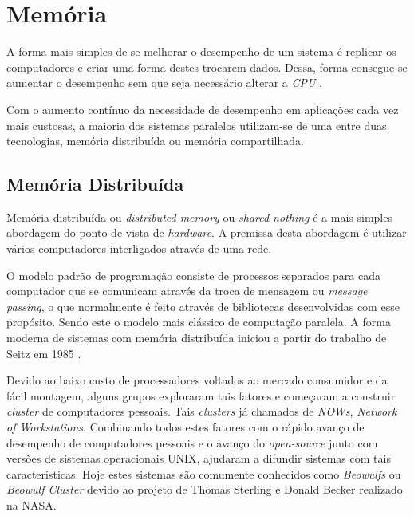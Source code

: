 \section{Memória}

A forma mais simples de se melhorar o desempenho de um sistema é
replicar os computadores e criar uma forma destes trocarem dados.
Dessa, forma consegue-se aumentar o desempenho sem que seja necessário alterar a
\textit{CPU} \cite[2.2]{sopc}.

Com o aumento contínuo da necessidade de desempenho em aplicações cada vez mais
custosas, a maioria dos sistemas paralelos utilizam-se de uma entre duas
tecnologias, memória distribuída ou memória compartilhada.


\subsection{Memória Distribuída}

Memória distribuída ou \textit{distributed memory} ou \textit{shared-nothing} é
a mais simples abordagem do ponto de vista de \textit{hardware}. 
A premissa desta abordagem é utilizar vários computadores interligados através 
de uma rede.

O modelo padrão de programação consiste de processos separados para cada
computador que se comunicam através da troca de mensagem ou 
\textit{message passing}, o que normalmente é feito através de bibliotecas
desenvolvidas com esse propósito. 
Sendo este o modelo mais clássico de computação paralela. 
A forma moderna de sistemas com memória distribuída iniciou a partir do trabalho 
de Seitz em 1985 \cite{Seitz:1985}.

Devido ao baixo custo de processadores voltados ao mercado consumidor e da fácil
montagem, alguns grupos exploraram tais fatores e começaram a construir
\textit{cluster} de computadores pessoais. 
Tais \textit{clusters} já chamados de \textit{NOWs}, 
\textit{Network of Workstations}.
Combinando todos estes fatores com o rápido avanço de desempenho de computadores
pessoais e o avanço do \textit{open-source} junto com  versões de sistemas 
operacionais UNIX, ajudaram a difundir sistemas com tais caracteristicas. 
Hoje estes sistemas são comumente conhecidos como \textit{Beowulfs} ou
\textit{Beowulf Cluster} devido ao projeto de Thomas Sterling e Donald Becker
realizado na NASA.

